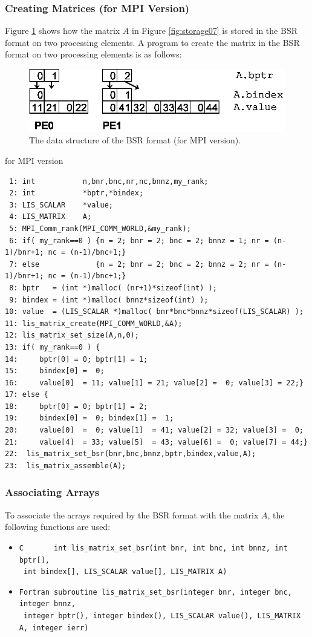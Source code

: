 \documentclass[a4paper]{article}
\begin{document}
\subsubsection{Creating Matrices (for MPI Version)}
Figure \ref{fig:storage07_mpi} shows how the matrix $A$ in Figure \ref{fig:storage07} is stored in the BSR format on two processing elements. A program to create the matrix in the BSR format on two processing elements is as follows:
\begin{figure}[h]
{\centering 
\includegraphics{storage07_mpi.eps} 
\caption{The data structure of the BSR format (for MPI version).}\label{fig:storage07_mpi}}
\end{figure}
\begin{itembox}[l]{for MPI version}
\small
\begin{verbatim}
 1: int           n,bnr,bnc,nr,nc,bnnz,my_rank;
 2: int           *bptr,*bindex;
 3: LIS_SCALAR    *value;
 4: LIS_MATRIX    A;
 5: MPI_Comm_rank(MPI_COMM_WORLD,&my_rank);
 6: if( my_rank==0 ) {n = 2; bnr = 2; bnc = 2; bnnz = 1; nr = (n-1)/bnr+1; nc = (n-1)/bnc+1;}
 7: else             {n = 2; bnr = 2; bnc = 2; bnnz = 2; nr = (n-1)/bnr+1; nc = (n-1)/bnc+1;}
 8: bptr   = (int *)malloc( (nr+1)*sizeof(int) );
 9: bindex = (int *)malloc( bnnz*sizeof(int) );
10: value  = (LIS_SCALAR *)malloc( bnr*bnc*bnnz*sizeof(LIS_SCALAR) );
11: lis_matrix_create(MPI_COMM_WORLD,&A);
12: lis_matrix_set_size(A,n,0);
13: if( my_rank==0 ) {
14:     bptr[0] = 0; bptr[1] = 1;
15:     bindex[0] =  0;
16:     value[0]  = 11; value[1] = 21; value[2] =  0; value[3] = 22;}
17: else {
18:     bptr[0] = 0; bptr[1] = 2;
19:     bindex[0] =  0; bindex[1] =  1;
20:     value[0]  =  0; value[1]  = 41; value[2] = 32; value[3] =  0;
21:     value[4]  = 33; value[5]  = 43; value[6] =  0; value[7] = 44;}
22:  lis_matrix_set_bsr(bnr,bnc,bnnz,bptr,bindex,value,A);
23:  lis_matrix_assemble(A);
\end{verbatim}
\end{itembox}
\subsubsection{Associating Arrays}
To associate the arrays required by the BSR format with the matrix $A$, the following functions are used:
\begin{itemize}
\item \verb|C       int lis_matrix_set_bsr(int bnr, int bnc, int bnnz, int bptr[],|\\
      \verb| int bindex[], LIS_SCALAR value[], LIS_MATRIX A)|
\item \verb|Fortran subroutine lis_matrix_set_bsr(integer bnr, integer bnc, integer bnnz,|\\
      \verb| integer bptr(), integer bindex(), LIS_SCALAR value(), LIS_MATRIX A, integer ierr)|
\end{itemize}
\end{document}
